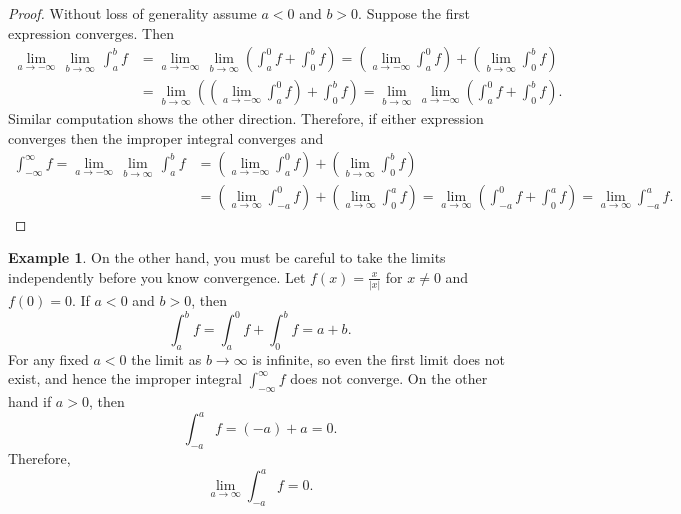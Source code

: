 \documentclass[12pt]{book}
\newcommand{\abs}[1]{\left\lvert {#1} \right\rvert}
\theoremstyle{plain}
\theoremstyle{remark}
\theoremstyle{definition}
\theoremstyle{exercise}
\theoremstyle{example}
\newtheorem{example}[thm]{Example}
\begin{document}
\begin{proof}
Without loss of generality assume $a < 0$ and $b > 0$.  Suppose
the first expression converges.  Then
\begin{equation*}
\begin{split}
\lim_{a \to -\infty} \, \lim_{b \to \infty} \, \int_a^b f
& =
\lim_{a \to -\infty} \, \lim_{b \to \infty}
\left(
\int_a^0 f
+
\int_0^b f
\right)
=
\left(
\lim_{a \to -\infty}
\int_a^0 f
\right)
+
\left(
 \lim_{b \to \infty}
\int_0^b f
\right) \\
& = 
 \lim_{b \to \infty}
\left(
\left(
\lim_{a \to -\infty}
\int_a^0 f
\right) 
+
\int_0^b f
\right)
=
 \lim_{b \to \infty} \,
\lim_{a \to -\infty}
\left(
\int_a^0 f
+
\int_0^b f
\right)  .
\end{split}
\end{equation*}
Similar computation shows the other direction.  Therefore, if
either expression converges then the improper integral converges
and
\begin{equation*}
\begin{split}
\int_{-\infty}^\infty f
=
\lim_{a \to -\infty} \, \lim_{b \to \infty} \, \int_a^b f
& =
\left(
\lim_{a \to -\infty}
\int_a^0 f
\right)
+
\left(
 \lim_{b \to \infty}
\int_0^b f
\right)
\\
& =
\left(
\lim_{a \to \infty}
\int_{-a}^0 f
\right)
+
\left(
 \lim_{a \to \infty}
\int_0^a f
\right)
=
\lim_{a \to \infty}
\left(
\int_{-a}^0 f
+
\int_0^a f
\right)
=
\lim_{a \to \infty}
\int_{-a}^a f .
\end{split}
\end{equation*}
\end{proof}

\begin{example}
On the other hand, you must be careful to
take the limits independently before you know convergence.  Let
$f(x) = \frac{x}{\abs{x}}$ for $x \not= 0$ and $f(0) = 0$.
If $a < 0$ and $b > 0$, then
\begin{equation*}
\int_{a}^b f
=
\int_{a}^0 f
+
\int_{0}^b f
=
a+b .
\end{equation*}
For any fixed $a < 0$ the limit as $b \to \infty$ is infinite, so even
the first limit does not exist, and hence the improper integral
$\int_{-\infty}^\infty f$
does not converge.  On the other hand if $a > 0$, then
\begin{equation*}
\int_{-a}^{a} f
=
(-a)+a = 0 .
\end{equation*}
Therefore,
\begin{equation*}
\lim_{a\to\infty}
\int_{-a}^{a} f
= 0 .
\end{equation*}
\end{example}
\end{document}
